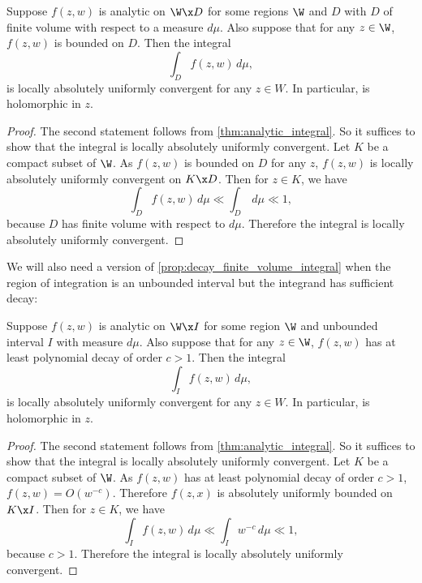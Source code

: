         \begin{proposition}\label{prop:decay_finite_volume_integral}
          Suppose $f(z,w)$ is analytic on $\W \x D$ for some regions $\W$ and $D$ with $D$ of finite volume with respect to a measure $d\mu$. Also suppose that for any $z \in \W$, $f(z,w)$ is bounded on $D$. Then the integral
          \[
            \int_{D}f(z,w)\,d\mu,
          \]
          is locally absolutely uniformly convergent for any $z \in W$. In particular, is holomorphic in $z$.
        \end{proposition}
        \begin{proof}
          The second statement follows from \cref{thm:analytic_integral}. So it suffices to show that the integral is locally absolutely uniformly convergent. Let $K$ be a compact subset of $\W$. As $f(z,w)$ is bounded on $D$ for any $z$, $f(z,w)$ is locally absolutely uniformly convergent on $K \x D$. Then for $z \in K$, we have
          \[
            \int_{D}f(z,w)\,d\mu \ll \int_{D}\,d\mu \ll 1, 
          \]
          because $D$ has finite volume with respect to $d\mu$. Therefore the integral is locally absolutely uniformly convergent. 
        \end{proof}

        We will also need a version of \cref{prop:decay_finite_volume_integral} when the region of integration is an unbounded interval but the integrand has sufficient decay:

        \begin{proposition}\label{prop:decay_unbounded_inteval_integral}
          Suppose $f(z,w)$ is analytic on $\W \x I$ for some region $\W$ and unbounded interval $I$ with measure $d\mu$. Also suppose that for any $z \in \W$, $f(z,w)$ has at least polynomial decay of order $c > 1$. Then the integral
          \[
            \int_{I}f(z,w)\,d\mu,
          \]
          is locally absolutely uniformly convergent for any $z \in W$. In particular, is holomorphic in $z$.
        \end{proposition}
        \begin{proof}
          The second statement follows from \cref{thm:analytic_integral}. So it suffices to show that the integral is locally absolutely uniformly convergent. Let $K$ be a compact subset of $\W$. As $f(z,w)$ has at least polynomial decay of order $c > 1$, $f(z,w) = O(w^{-c})$. Therefore $f(z,x)$ is absolutely uniformly bounded on $K \x I$. Then for $z \in K$, we have
          \[
            \int_{I}f(z,w)\,d\mu \ll \int_{I}w^{-c}\,d\mu \ll 1, 
          \]
          because $c > 1$. Therefore the integral is locally absolutely uniformly convergent. 
        \end{proof}

